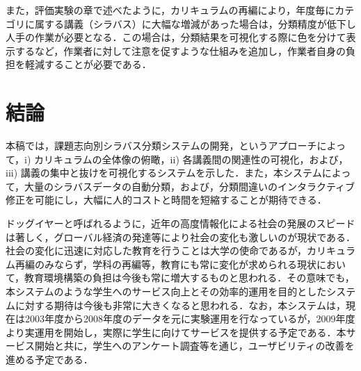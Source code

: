 \documentclass[japanese]{jnlp_1.4}
\begin{document}
また，評価実験の章で述べたように，カリキュラムの再編により，年度毎にカテゴリに属する講義（シラバス）に大幅な増減があった場合は，分類精度が低下し人手の作業が必要となる．この場合は，分類結果を可視化する際に色を分けて表示するなど，作業者に対して注意を促すような仕組みを追加し，作業者自身の負担を軽減することが必要である．


\section{結論}

本稿では，課題志向別シラバス分類システムの開発，というアプローチによって，i) カリキュラムの全体像の俯瞰，ii) 各講義間の関連性の可視化，および， iii) 講義の集中と抜けを可視化するシステムを示した．また，本システムによって，大量のシラバスデータの自動分類，および，分類間違いのインタラクティブ修正を可能にし，大幅に人的コストと時間を短縮することが期待できる．

ドッグイヤーと呼ばれるように，近年の高度情報化による社会の発展のスピードは著しく，グローバル経済の発達等により社会の変化も激しいのが現状である．社会の変化に迅速に対応した教育を行うことは大学の使命であるが，カリキュラム再編のみならず，学科の再編等，教育にも常に変化が求められる現状において，教育環境構築の負担は今後も常に増大するものと思われる．その意味でも，本システムのような学生へのサービス向上とその効率的運用を目的としたシステムに対する期待は今後も非常に大きくなると思われる．なお，本システムは，現在は2003年度から2008年度のデータを元に実験運用を行なっているが，2009年度より実運用を開始し，実際に学生に向けてサービスを提供する予定である．本サービス開始と共に，学生へのアンケート調査等を通じ，ユーザビリティの改善を進める予定である．
\end{document}
